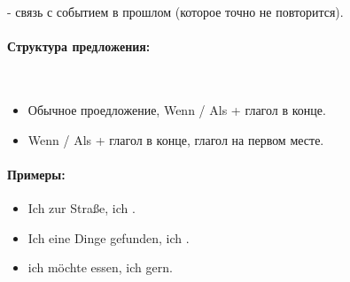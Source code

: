  - связь с событием в прошлом (которое точно не повторится). 

\paragraph{Структура предложения:} ~\\
\begin{itemize}
\item Обычное проедложение, Wenn / Als + глагол в конце.
\item Wenn / Als + глагол в конце, глагол на первом месте.
\end{itemize}

\paragraph{Примеры:}
\begin{itemize}
\item Ich  zur Straße,  ich .
~\\ 
\item Ich  eine Dinge gefunden,  ich .
~\\ 
\item {} ich möchte essen,  ich gern.
~\\ 
\end{itemize}

